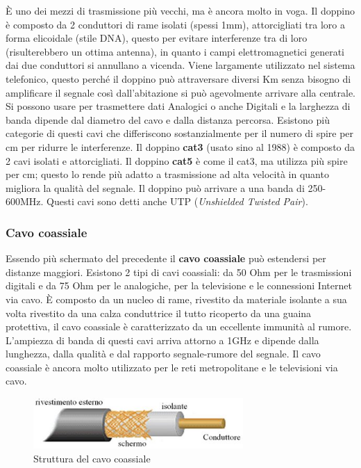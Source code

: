 È uno dei mezzi di trasmissione più vecchi, ma è ancora molto in voga. Il doppino è composto da 2 conduttori di rame isolati (spessi 1mm), attorcigliati tra loro a forma elicoidale (stile DNA), questo per evitare interferenze tra di loro (risulterebbero un ottima antenna), in quanto i campi elettromagnetici generati dai due conduttori si annullano a vicenda. Viene largamente utilizzato nel sistema telefonico, questo perché il doppino può attraversare diversi Km senza bisogno di amplificare il segnale così dall'abitazione si può agevolmente arrivare alla centrale. Si possono usare per trasmettere dati Analogici o anche Digitali e la larghezza di banda dipende dal diametro del cavo e dalla distanza percorsa. Esistono più categorie di questi cavi che differiscono sostanzialmente per il numero di spire per cm per ridurre le interferenze. Il doppino \textbf{cat3} (usato sino al 1988) è composto da 2 cavi isolati e attorcigliati. Il doppino \textbf{cat5} è come il cat3, ma utilizza più spire per cm; questo lo rende più adatto a trasmissione ad alta velocità in quanto migliora la qualità del segnale. Il doppino può arrivare a una banda di 250-600MHz. Questi cavi sono detti anche UTP (\textit{Unshielded Twisted Pair}).

\subsubsection{Cavo coassiale}
	
Essendo più schermato del precedente il \textbf{cavo coassiale} può estendersi per distanze maggiori. Esistono 2 tipi di cavi coassiali: da 50 Ohm per le trasmissioni digitali e da 75 Ohm per le analogiche, per la televisione e le connessioni Internet via cavo. 
È composto da un nucleo di rame, rivestito da materiale isolante a sua volta rivestito da una calza conduttrice il tutto ricoperto da una guaina protettiva, il cavo coassiale è caratterizzato da un eccellente immunità al rumore. L'ampiezza di banda di questi cavi arriva attorno a 1GHz e dipende dalla lunghezza, dalla qualità e dal rapporto segnale-rumore del segnale. Il cavo coassiale è ancora molto utilizzato per le reti metropolitane e le televisioni via cavo.

\begin{figure}[htbp]
\centering
\includegraphics[width=80mm]{images/cavo_coassiale.jpg}
\caption{Struttura del cavo coassiale}
\end{figure}

